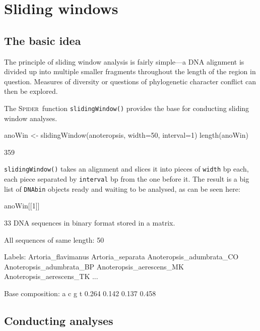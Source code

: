 \documentclass{article}
\newcommand{\spider}{\textsc{Spider}~} %
\newcommand{\fun}[1]{\texttt{#1}}
\begin{document}

\section{Sliding windows}

\subsection{The basic idea}
The principle of sliding window analysis is fairly simple---a DNA alignment is divided up into multiple smaller fragments throughout the length of the region in question. Measures of diversity \citep{Roe.Sper.2007} or questions of phylogenetic character conflict \citep{Crui.2011} can then be explored.

The \spider function \fun{slidingWindow()} provides the base for conducting sliding window analyses. 

\begin{console}
anoWin <- slidingWindow(anoteropsis, width=50, interval=1)
length(anoWin)
\end{console}

\begin{Routput}
[1] 359
\end{Routput}

\fun{slidingWindow()} takes an alignment and slices it into pieces of \fun{width} bp each, each piece separated by \fun{interval} bp from the one before it. The result is a big list of \fun{DNAbin} objects ready and waiting to be analysed, as can be seen here:

\begin{console}
anoWin[[1]]
\end{console}

\begin{Routput}
33 DNA sequences in binary format stored in a matrix.

All sequences of same length: 50 

Labels: Artoria_flavimanus Artoria_separata Anoteropsis_adumbrata_CO 
Anoteropsis_adumbrata_BP Anoteropsis_aerescens_MK Anoteropsis_aerescens_TK ...

Base composition:
    a     c     g     t 
0.264 0.142 0.137 0.458 
\end{Routput}

\subsection{Conducting analyses}
\end{document}
